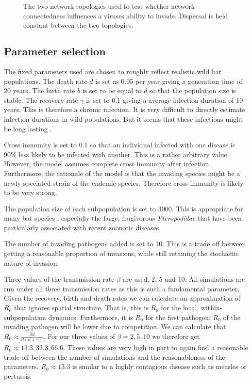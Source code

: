 \begin{figure}[b]
\caption[Network topologies used to test whether network connectedness influences pathogen invasion]{
The two network topologies used to test whether network connectedness influences a viruses ability to invade. 
Dispersal is held constant between the two topologies.
}
\label{f:net}
\end{figure}





\subsection{Parameter selection}


The fixed parameters used are chosen to roughly reflect realistic wild bat populations. 
The death rate $d$ is set as 0.05 per year giving a generation time of 20 years.
The birth rate $b$ is set to be equal to $d$ so that the population size is stable.
The recovery rate $\gamma$ is set to 0.1 giving a average infection duration of 10 years. 
This is therefore a chronic infection. 
It is very difficult to directly estimate infection durations in wild populations.
But it seems that these infections might be long lasting \cite{}.

Cross immunity is set to 0.1 so that an individual infected with one disease is 90\% less likely to be infected with another.
This is a rather arbitrary value.
However, the model assumes complete cross immunity after infection.
Furthermore, the rationale of the model is that the invading species might be a newly speciated strain of the endemic species.
Therefore cross immunity is likely to be very strong.

The population size of each subpopulation is set to 3000. 
This is appropriate for many bat species \cite{jones2009pantheria}, especially the large, frugivorous \emph{Pteropodidae} that have been particularly associated with recent zoonotic diseases.

The number of invading pathogens added is set to 10. 
This is a trade off between getting a reasonable proportion of invasions, while still retaining the stochastic nature of invasion.

Three values of the transmission rate $\beta$ are used, 2, 5 and 10.
All simulations are run under all three transmission rates as this is such a fundamental parameter.
Given the recovery, birth and death rates we can calculate an approximation of $R_0$ that ignores spatial structure.
That is, this is $R_0$ for the local, within-subpopulation dynamics.
Furthermore, it is $R_0$ for the first pathogen; $R_0$ of the invading pathogen will be lower due to competition.
We can calculate that $R_0 \approx \frac{\beta d}{d(d+ \gamma)}$.
For our three values of $\beta = 2, 5, 10$ we therefore get $R_0 \approx 13.3, 33.3, 66.6$.
These values are very high in part to again find a reasonable trade off between the number of simulations and the reasonableness of the parameters.
$R_0 \approx 13.3$ is similar to a highly contagious disease such as measles or pertussis. 



